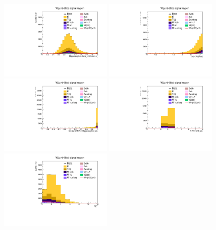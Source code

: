 \begin{figure}[tbp]
  \begin{center}
    \includegraphics[width=0.48\textwidth]{figures/wlnhbb2016/resolved/WmnWHSR_pTBalanceDijetW.pdf}
    \includegraphics[width=0.48\textwidth]{figures/wlnhbb2016/resolved/WmnWHSR_deltaPhiVH.pdf}
    \includegraphics[width=0.48\textwidth]{figures/wlnhbb2016/resolved/WmnWHSR_bDiscrMax.pdf}
    \includegraphics[width=0.48\textwidth]{figures/wlnhbb2016/resolved/WmnWHSR_nJet.pdf}
    \includegraphics[width=0.48\textwidth]{figures/wlnhbb2016/resolved/WmnWHSR_nSoft5.pdf}

\end{center}
\end{figure}
